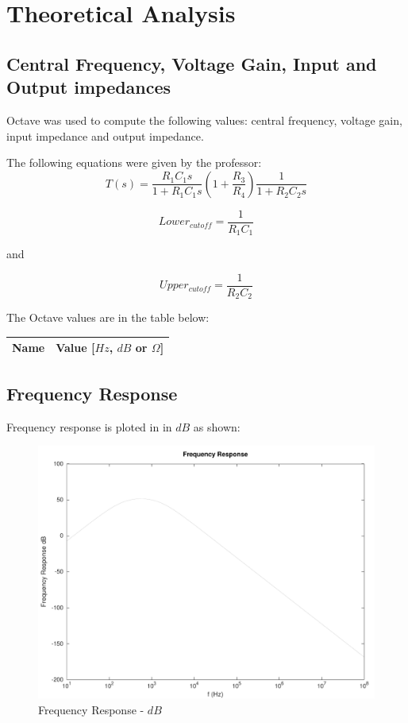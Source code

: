 \newpage

\section{Theoretical Analysis}
\label{sec:analysis}

\subsection{Central Frequency, Voltage Gain, Input and Output impedances}
Octave was used to compute the following values: central frequency, voltage gain, input impedance and output impedance. \par
The following equations were given by the professor:
\begin{equation}
    T(s) = \frac{R_1 C_1 s}{1+ R_1 C_1 s} (1+\frac{R_3}{R_4}) \frac{1}{1+ R_2 C_2 s}
\end{equation}\par
 \par
\begin{equation}
    Lower_{cutoff} = \frac{1}{R_1 C_1}
\end{equation}\par
and \par
\begin{equation}
    Upper_{cutoff} = \frac{1}{R_2 C_2}
\end{equation}\par
The Octave values are in the table below:

\begin{center}
  \begin{tabular}{ | c | c | }
    \hline    
    {\bf Name} & {\bf Value [$Hz$, $dB$ or $\Omega$]} \\ \hline
    
    \hline
  \end{tabular}
\end{center}

\subsection{Frequency Response}
Frequency response is ploted in in $dB$ as shown:\par

\begin{figure}[H] \centering
\includegraphics[width=0.7\linewidth]{../mat/fresponse1.pdf}
\caption{Frequency Response - $dB$}
\label{fig:fresponse1}
\end{figure}


